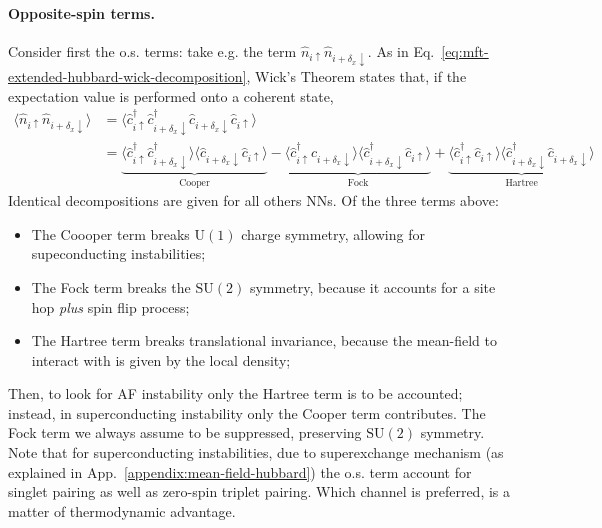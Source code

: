 \paragraph{Opposite-spin terms.}

Consider first the o.s. terms: take e.g. the term $\hat n_{i\uparrow} \hat n_{i + \delta_x \downarrow}$. As in Eq.~\eqref{eq:mft-extended-hubbard-wick-decomposition}, Wick's Theorem states that, if the expectation value is performed onto a coherent state,
\[
\begin{aligned}
	\langle 
		\hat n_{i\uparrow} \hat n_{i + \delta_x \downarrow}
	\rangle &= \langle 
		\hat c_{i\uparrow}^\dagger \hat c_{i + \delta_x \downarrow}^\dagger \hat c_{i + \delta_x \downarrow} \hat c_{i\uparrow} 
	\rangle \\
	&= 
	\underbrace{
		\langle 
			\hat c_{i\uparrow}^\dagger \hat c_{i + \delta_x \downarrow}^\dagger
		\rangle \langle	
			\hat c_{i + \delta_x \downarrow} \hat c_{i\uparrow} 
		\rangle 
	}_{\text{Cooper}}
	- 
	\underbrace{
		\langle 
			\hat c_{i\uparrow}^\dagger \hat c_{i + \delta_x \downarrow}
		\rangle \langle	
			\hat c_{i + \delta_x \downarrow}^\dagger \hat c_{i\uparrow} 
		\rangle 
	}_{\text{Fock}}
	+ 
	\underbrace{
		\langle 
			\hat c_{i\uparrow}^\dagger \hat c_{i\uparrow}
		\rangle \langle	
			\hat c_{i + \delta_x \downarrow}^\dagger \hat c_{i + \delta_x \downarrow} 
		\rangle
	}_{\text{Hartree}}
\end{aligned}
\]
Identical decompositions are given for all others NNs. Of the three terms above:
\begin{itemize}
	\item The Coooper term breaks $\mathrm{U}(1)$ charge symmetry, allowing for supeconducting instabilities;
	\item The Fock term breaks the $\mathrm{SU}(2)$ symmetry, because it accounts for a site hop \textit{plus} spin flip process;
	\item The Hartree term breaks translational invariance, because the mean-field to interact with is given by the local density;
\end{itemize}
Then, to look for AF instability only the Hartree term is to be accounted; instead, in superconducting instability only the Cooper term contributes. The Fock term we always assume to be suppressed, preserving $\mathrm{SU}(2)$ symmetry. Note that for superconducting instabilities, due to superexchange mechanism (as explained in App.~\ref{appendix:mean-field-hubbard}) the o.s. term account for singlet pairing as well as zero-spin triplet pairing. Which channel is preferred, is a matter of thermodynamic advantage.

